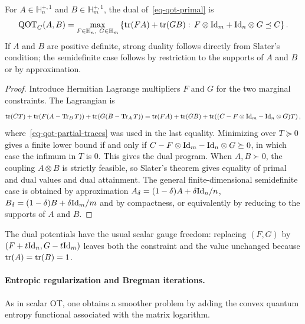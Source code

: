 \begin{prop}\label{prop-qot-duality}
	For $A\in\mathbb H_n^{+,1}$ and $B\in\mathbb H_m^{+,1}$, the dual of~\eqref{eq-qot-primal} is
	\begin{equation}\label{eq-qot-dual}
		\mathrm{QOT}_C(A,B)
		=
		\max_{F\in\mathbb H_n,\ G\in\mathbb H_m}
		\left\{
			\operatorname{tr}(FA)+\operatorname{tr}(GB)
			:\,
			F\otimes\mathrm{Id}_m+\mathrm{Id}_n\otimes G\preceq C
		\right\}.
	\end{equation}
	If $A$ and $B$ are positive definite, strong duality follows directly from Slater's condition; the semidefinite case follows by restriction to the supports of $A$ and $B$ or by approximation.
\end{prop}

\begin{proof}
	Introduce Hermitian Lagrange multipliers $F$ and $G$ for the two marginal constraints. The Lagrangian is
	\[
		\operatorname{tr}(CT)+\operatorname{tr}\!\left(F(A-\operatorname{Tr}_B T)\right)
		+\operatorname{tr}\!\left(G(B-\operatorname{Tr}_A T)\right)
		=
		\operatorname{tr}(FA)+\operatorname{tr}(GB)
		+\operatorname{tr}\!\left((C-F\otimes\mathrm{Id}_m-\mathrm{Id}_n\otimes G)T\right),
	\]
	where~\eqref{eq-qot-partial-traces} was used in the last equality. Minimizing over $T\succeq0$ gives a finite lower bound if and only if $C-F\otimes\mathrm{Id}_m-\mathrm{Id}_n\otimes G\succeq0$, in which case the infimum in $T$ is $0$. This gives the dual program. When $A,B\succ0$, the coupling $A\otimes B$ is strictly feasible, so Slater's theorem gives equality of primal and dual values and dual attainment. The general finite-dimensional semidefinite case is obtained by approximation $A_\delta=(1-\delta)A+\delta\mathrm{Id}_n/n$, $B_\delta=(1-\delta)B+\delta\mathrm{Id}_m/m$ and by compactness, or equivalently by reducing to the supports of $A$ and $B$.
\end{proof}

The dual potentials have the usual scalar gauge freedom: replacing $(F,G)$ by $(F+t\mathrm{Id}_n,G-t\mathrm{Id}_m)$ leaves both the constraint and the value unchanged because $\operatorname{tr}(A)=\operatorname{tr}(B)=1$.

\paragraph{Entropic regularization and Bregman iterations.}
As in scalar OT, one obtains a smoother problem by adding the convex quantum entropy functional associated with the matrix logarithm.

